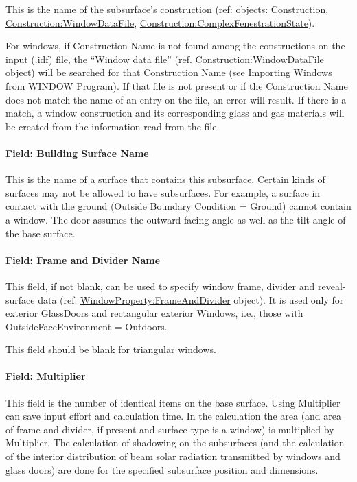 This is the name of the subsurface's construction (ref: objects: Construction, \hyperref[constructionwindowdatafile]{Construction:WindowDataFile}, \hyperref[constructioncomplexfenestrationstate]{Construction:ComplexFenestrationState}).

For windows, if Construction Name is not found among the constructions on the input (.idf) file, the ``Window data file'' (ref. \hyperref[constructionwindowdatafile]{Construction:WindowDataFile} object) will be searched for that Construction Name (see \hyperref[importing-windows-from-window-program]{Importing Windows from WINDOW Program}). If that file is not present or if the Construction Name does not match the name of an entry on the file, an error will result. If there is a match, a window construction and its corresponding glass and gas materials will be created from the information read from the file.

\paragraph{Field: Building Surface Name}\label{field-building-surface-name-2}

This is the name of a surface that contains this subsurface. Certain kinds of surfaces may not be allowed to have subsurfaces. For example, a surface in contact with the ground (Outside Boundary Condition = Ground) cannot contain a window. The door assumes the outward facing angle as well as the tilt angle of the base surface.

\paragraph{Field: Frame and Divider Name}\label{field-frame-and-divider-name-1}

This field, if not blank, can be used to specify window frame, divider and reveal-surface data (ref: \hyperref[windowpropertyframeanddivider]{WindowProperty:FrameAndDivider} object). It is used only for exterior GlassDoors and rectangular exterior Windows, i.e., those with OutsideFaceEnvironment = Outdoors.

This field should be blank for triangular windows.

\paragraph{Field: Multiplier}\label{field-multiplier-3}

This field is the number of identical items on the base surface. Using Multiplier can save input effort and calculation time. In the calculation the area (and area of frame and divider, if present and surface type is a window) is multiplied by Multiplier. The calculation of shadowing on the subsurfaces (and the calculation of the interior distribution of beam solar radiation transmitted by windows and glass doors) are done for the specified subsurface position and dimensions.

